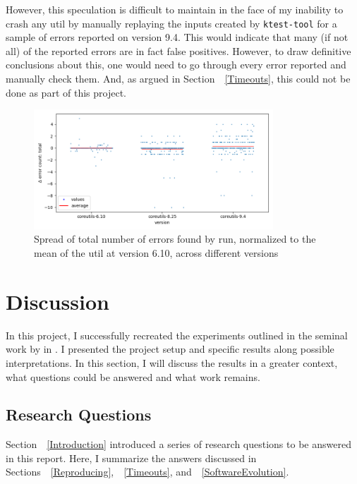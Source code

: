 \documentclass{article}
\let\savedRef=\ref
\renewcommand{\ref}{\unskip~\savedRef}
\begin{document}
However, this speculation is difficult to maintain in the face of my inability to crash any util by manually replaying the inputs created by \lstinline{ktest-tool} for a sample of errors reported on version 9.4. This would indicate that many (if not all) of the reported errors are in fact false positives. However, to draw definitive conclusions about this, one would need to go through every error reported and manually check them. And, as argued in Section~\ref{Timeouts}, this could not be done as part of this project.

\begin{figure}[htbp]
    \centering
    \includegraphics[width=0.8\textwidth]{../plots/num_errors (total)/changes-by-version.png}
    \captionsetup{width=0.6\textwidth}
    \caption{Spread of total number of errors found by run, normalized to the mean of the util at version 6.10, across different versions}
    \label{fig:spread_across_version_errors}
\end{figure}


\section{Discussion}

In this project, I successfully recreated the experiments outlined in the seminal work by \citeauthor{KLEE} in . I presented the project setup and specific results along possible interpretations. In this section, I will discuss the results in a greater context, what questions could be answered and what work remains.

\subsection{Research Questions}

Section~\ref{Introduction} introduced a series of research questions to be answered in this report. Here, I summarize the answers discussed in Sections~\ref{Reproducing},~\ref{Timeouts}, and~\ref{SoftwareEvolution}.
\end{document}
